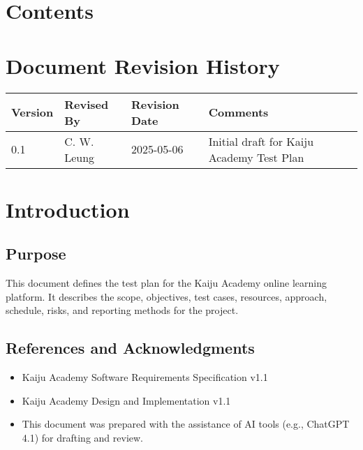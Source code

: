 \documentclass[a4paper,11pt]{scrartcl}
\begin{document}
\section*{Contents}
\tableofcontents
\clearpage

\section*{Document Revision History}
\begin{center}
\begin{tabularx}{\textwidth}{l l l X}
\toprule
Version & Revised By & Revision Date & Comments \\
\midrule
0.1 & C. W. Leung & 2025-05-06 & Initial draft for Kaiju Academy Test Plan \\
\bottomrule

\end{tabularx}
\end{center}

\clearpage
{}


\section{Introduction}

\subsection{Purpose}
This document defines the test plan for the Kaiju Academy online learning platform. It describes the scope, objectives, test cases, resources, approach, schedule, risks, and reporting methods for the project.

\subsection{References and Acknowledgments}
\begin{itemize}[leftmargin=*]
    \item Kaiju Academy Software Requirements Specification v1.1
    \item Kaiju Academy Design and Implementation v1.1
    \item This document was prepared with the assistance of AI tools (e.g., ChatGPT 4.1) for drafting and review.
\end{itemize}
\end{document}
